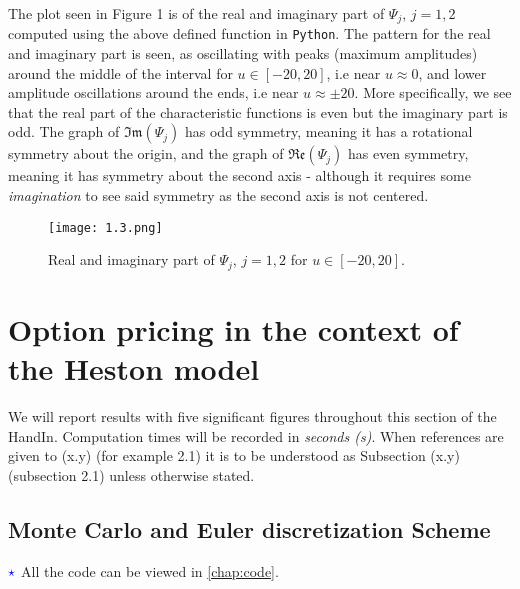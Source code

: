 \documentclass[11pt]{article}
\numberwithin{equation}{section}
\begin{document}
\newpage
The plot seen in Figure 1 is of the real and imaginary part of
$\Psi_j$, $j=1,2$ computed using the above defined function in \texttt{Python}.
The pattern for the real and imaginary part is seen, as oscillating with peaks
(maximum amplitudes)
around the middle of the interval
for $u\in [-20,20]$, i.e near $u \approx 0$, and lower amplitude oscillations around the
ends, i.e near $u\approx \pm 20$. More specifically, we see that the real part
of the characteristic functions is even but the imaginary part is odd. The graph
of $\mathfrak{Im}(\Psi_j)$ has odd symmetry, meaning it has a rotational
symmetry about the origin, and the graph of $\mathfrak{Re}(\Psi_j)$ has even
symmetry, meaning it has symmetry about the second axis - although it requires
some \textit{imagination} to see said symmetry as the second axis is not centered.
\begin{figure}[!h]
    \begin{adjustwidth}{-2cm}{-2cm}  
      \centering
      \texttt{[image: 1.3.png]} 
      \label{Figure 1}
    \end{adjustwidth}
    \captionsetup{skip=-20pt}
    \caption{Real and imaginary part of $\Psi_j$, $j=1,2$ for $u\in [-20,20]$.}
\end{figure}

\newpage
\section{Option pricing in the context of the Heston model}
We will report results with five significant figures throughout this section of
the HandIn. Computation times will be recorded in \textit{seconds (s)}. When
references are given to (x.y) (for example 2.1) it is to be understood as
Subsection (x.y) (subsection 2.1) unless otherwise stated.
\subsection{Monte Carlo and Euler discretization Scheme}
$\textcolor{blue}{\star}$ All the code can be viewed in \autoref{chap:code}.
\end{document}
